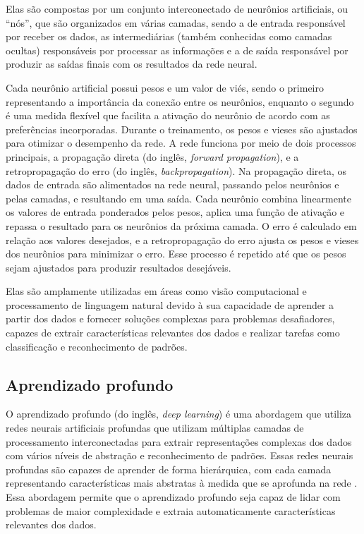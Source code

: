 Elas são compostas por um conjunto interconectado de neurônios artificiais, ou ``nós'', que são organizados em várias camadas, sendo a de entrada responsável por receber os dados, as intermediárias (também conhecidas como camadas ocultas) responsáveis por processar as informações e a de saída responsável por produzir as saídas finais com os resultados da rede neural.

Cada neurônio artificial possui pesos e um valor de viés, sendo o primeiro representando a importância da conexão entre os neurônios, enquanto o segundo é uma medida flexível que facilita a ativação do neurônio de acordo com as preferências incorporadas. Durante o treinamento, os pesos e vieses são ajustados para otimizar o desempenho da rede. A rede funciona por meio de dois processos principais, a propagação direta (do inglês, \textit{forward propagation}), e a retropropagação do erro (do inglês, \textit{backpropagation}). Na propagação direta, os dados de entrada são alimentados na rede neural, passando pelos neurônios e pelas camadas, e resultando em uma saída. Cada neurônio combina linearmente os valores de entrada ponderados pelos pesos, aplica uma função de ativação e repassa o resultado para os neurônios da próxima camada. O erro é calculado em relação aos valores desejados, e a retropropagação do erro ajusta os pesos e vieses dos neurônios para minimizar o erro. Esse processo é repetido até que os pesos sejam ajustados para produzir resultados desejáveis.

Elas são amplamente utilizadas em áreas como visão computacional e processamento de linguagem natural devido à sua capacidade de aprender a partir dos dados e fornecer soluções complexas para problemas desafiadores, capazes de extrair características relevantes dos dados e realizar tarefas como classificação e reconhecimento de padrões.

\subsection{Aprendizado profundo}

O aprendizado profundo (do inglês, \textit{deep learning}) é uma abordagem que utiliza redes neurais artificiais profundas que utilizam múltiplas camadas de processamento interconectadas para extrair representações complexas dos dados com vários níveis de abstração e reconhecimento de padrões. Essas redes neurais profundas são capazes de aprender de forma hierárquica, com cada camada representando características mais abstratas à medida que se aprofunda na rede \cite{AurelienGeron2019}. Essa abordagem permite que o aprendizado profundo seja capaz de lidar com problemas de maior complexidade e extraia automaticamente características relevantes dos dados.

